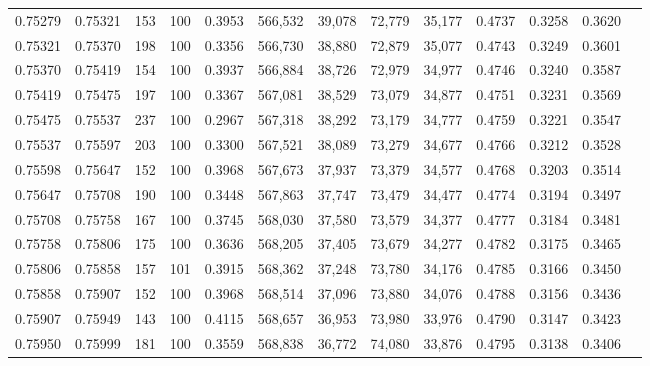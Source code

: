 \begin{tabular}{rrrrrrrrrrrrr}
0.75279 & 0.75321 &   153 & 100 &                                     0.3953 & 566,532 &  39,078 &  72,779 &  35,177 & 0.4737 & 0.3258 & 0.3620 \\
0.75321 & 0.75370 &   198 & 100 &                                     0.3356 & 566,730 &  38,880 &  72,879 &  35,077 & 0.4743 & 0.3249 & 0.3601 \\
0.75370 & 0.75419 &   154 & 100 &                                     0.3937 & 566,884 &  38,726 &  72,979 &  34,977 & 0.4746 & 0.3240 & 0.3587 \\
0.75419 & 0.75475 &   197 & 100 &                                     0.3367 & 567,081 &  38,529 &  73,079 &  34,877 & 0.4751 & 0.3231 & 0.3569 \\
0.75475 & 0.75537 &   237 & 100 &                                     0.2967 & 567,318 &  38,292 &  73,179 &  34,777 & 0.4759 & 0.3221 & 0.3547 \\
0.75537 & 0.75597 &   203 & 100 &                                     0.3300 & 567,521 &  38,089 &  73,279 &  34,677 & 0.4766 & 0.3212 & 0.3528 \\
0.75598 & 0.75647 &   152 & 100 &                                     0.3968 & 567,673 &  37,937 &  73,379 &  34,577 & 0.4768 & 0.3203 & 0.3514 \\
0.75647 & 0.75708 &   190 & 100 &                                     0.3448 & 567,863 &  37,747 &  73,479 &  34,477 & 0.4774 & 0.3194 & 0.3497 \\
0.75708 & 0.75758 &   167 & 100 &                                     0.3745 & 568,030 &  37,580 &  73,579 &  34,377 & 0.4777 & 0.3184 & 0.3481 \\
0.75758 & 0.75806 &   175 & 100 &                                     0.3636 & 568,205 &  37,405 &  73,679 &  34,277 & 0.4782 & 0.3175 & 0.3465 \\
0.75806 & 0.75858 &   157 & 101 &                                     0.3915 & 568,362 &  37,248 &  73,780 &  34,176 & 0.4785 & 0.3166 & 0.3450 \\
0.75858 & 0.75907 &   152 & 100 &                                     0.3968 & 568,514 &  37,096 &  73,880 &  34,076 & 0.4788 & 0.3156 & 0.3436 \\
0.75907 & 0.75949 &   143 & 100 &                                     0.4115 & 568,657 &  36,953 &  73,980 &  33,976 & 0.4790 & 0.3147 & 0.3423 \\
0.75950 & 0.75999 &   181 & 100 &                                     0.3559 & 568,838 &  36,772 &  74,080 &  33,876 & 0.4795 & 0.3138 & 0.3406 \\

\end{tabular}
